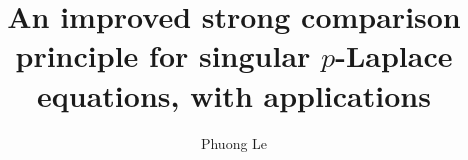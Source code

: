 \documentclass[reqno]{amsart}
\theoremstyle{plain}
\theoremstyle{definition}
\theoremstyle{remark}
\begin{document}
\author{Phuong Le}
\address{Phuong Le$^{1,2}$ (ORCID: 0000-0003-4724-7118)\newline
	$^1$Faculty of Economic Mathematics, University of Economics and Law, Ho Chi Minh City, Vietnam; \newline
	$^2$Vietnam National University, Ho Chi Minh City, Vietnam}
\title[An improved strong comparison principle]{An improved strong comparison principle for
singular $p$-Laplace equations, with applications}
\end{document}
